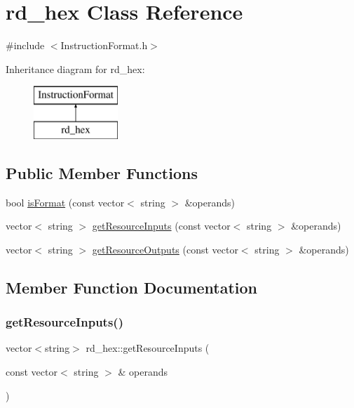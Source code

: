 \hypertarget{classrd__hex}{}\section{rd\+\_\+hex Class Reference}
\label{classrd__hex}


{\ttfamily \#include $<$Instruction\+Format.\+h$>$}

Inheritance diagram for rd\+\_\+hex\+:\begin{figure}[H]
\begin{center}
\leavevmode
\includegraphics[height=2.000000cm]{classrd__hex}
\end{center}
\end{figure}
\subsection*{Public Member Functions}
\begin{DoxyCompactItemize}
\item 
bool \hyperlink{classrd__hex_a9e91ce0f836feac13681445ef741edf2}{is\+Format} (const vector$<$ string $>$ \&operands)
\item 
vector$<$ string $>$ \hyperlink{classrd__hex_a4afabb7f88c944befc0cd880b2f574f1}{get\+Resource\+Inputs} (const vector$<$ string $>$ \&operands)
\item 
vector$<$ string $>$ \hyperlink{classrd__hex_a5f437d79049848b5038272a70fb09cc3}{get\+Resource\+Outputs} (const vector$<$ string $>$ \&operands)
\end{DoxyCompactItemize}


\subsection{Member Function Documentation}
\mbox{\label{classrd__hex_a4afabb7f88c944befc0cd880b2f574f1}} 
\subsubsection{\texorpdfstring{get\+Resource\+Inputs()}{getResourceInputs()}}
{\footnotesize\ttfamily vector$<$string$>$ rd\+\_\+hex\+::get\+Resource\+Inputs (\begin{DoxyParamCaption}\item[{const vector$<$ string $>$ \&}]{operands }\end{DoxyParamCaption})\hspace{0.3cm}{\ttfamily [virtual]}}

